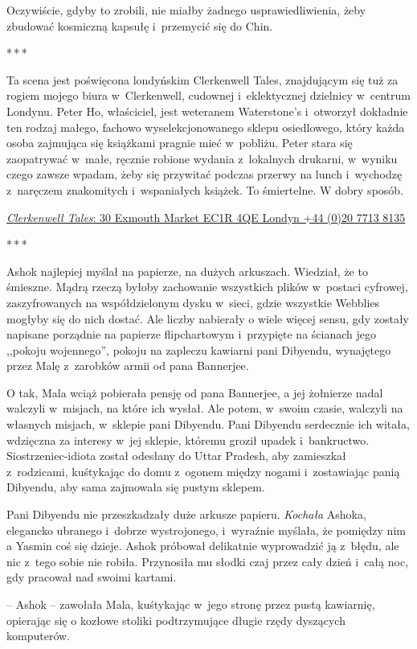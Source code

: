 \documentclass[oneside,polish,11pt,rmheadings]{mwbk}
\newcommand{\threeast}{\par\centerline{*\,*\,*}\medskip\par}
\begin{document}
Oczywiście, gdyby to zrobili, nie miałby żadnego usprawiedliwienia, żeby zbudować kosmiczną kapsułę i~przemycić się do Chin.

\bigskip
\threeast

Ta scena jest poświęcona londyńskim Clerkenwell Tales, znajdującym się tuż za rogiem mojego biura w~Clerkenwell, cudownej i~eklektycznej dzielnicy w~centrum Londynu. Peter Ho, właściciel, jest weteranem Waterstone's i~otworzył dokładnie ten rodzaj małego, fachowo wyselekcjonowanego sklepu osiedlowego, który każda osoba zajmująca się książkami pragnie mieć w~pobliżu. Peter stara się zaopatrywać w~małe, ręcznie robione wydania z~lokalnych drukarni, w~wyniku czego zawsze wpadam, żeby się przywitać podczas przerwy na lunch i~wychodzę z~naręczem znakomitych i~wspaniałych książek. To śmiertelne. W dobry sposób.

\href{https://www.clerkenwell-tales.co.uk/}{\textit{Clerkenwell Tales}: 30 Exmouth Market EC1R 4QE Londyn +44 (0)20 7713 8135} 

\bigskip
\threeast

Ashok najlepiej myślał na papierze, na dużych arkuszach. Wiedział, że to śmieszne. Mądrą rzeczą byłoby zachowanie wszystkich plików w~postaci cyfrowej, zaszyfrowanych na współdzielonym dysku w~sieci, gdzie wszystkie Webblies mogłyby się do nich dostać. Ale liczby nabierały o wiele więcej sensu, gdy zostały napisane porządnie na papierze flipchartowym i~przypięte na ścianach jego ,,pokoju wojennego'', pokoju na zapleczu kawiarni pani Dibyendu, wynajętego przez Malę z~zarobków armii od pana Bannerjee.

O tak, Mala wciąż pobierała pensję od pana Bannerjee, a jej żołnierze nadal walczyli w~misjach, na które ich wysłał. Ale potem, w~swoim czasie, walczyli na własnych misjach, w~sklepie pani Dibyendu. Pani Dibyendu serdecznie ich witała, wdzięczna za interesy w~jej sklepie, któremu groził upadek i~bankructwo. Siostrzeniec-idiota został odesłany do Uttar Pradesh, aby zamieszkał z~rodzicami, kuśtykając do domu z~ogonem między nogami i~zostawiając panią Dibyendu, aby sama zajmowała się pustym sklepem.

Pani Dibyendu nie przeszkadzały duże arkusze papieru. \textit{Kochała }Ashoka, elegancko ubranego i~dobrze wystrojonego, i~wyraźnie myślała, że pomiędzy nim a Yasmin coś się dzieje. Ashok próbował delikatnie wyprowadzić ją z~błędu, ale nic z~tego sobie nie robiła. Przynosiła mu słodki czaj przez cały dzień i~całą noc, gdy pracował nad swoimi kartami.

-- Ashok -- zawołała Mala, kuśtykając w~jego stronę przez pustą kawiarnię, opierając się o kozłowe stoliki podtrzymujące długie rzędy dyszących komputerów.
\end{document}
